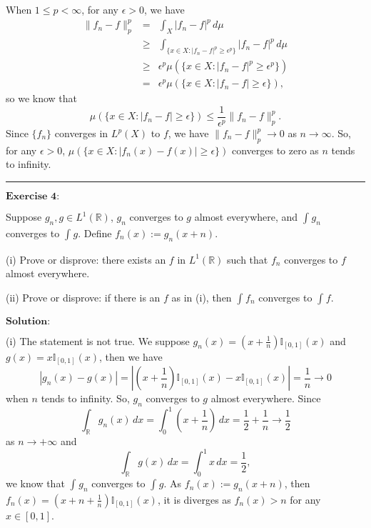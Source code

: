 \documentclass[12pt]{article}
\begin{document}
When $1 \leq p < \infty$, for any $\epsilon > 0$, we have
\begin{eqnarray*}
\|f_{n} - f\|_{p}^{p} & = & \int_{X}^{} |f_{n} - f|^{p} \, d \mu \\
& \geq & \int_{\{x \in X: |f_{n} - f|^{p} \geq \epsilon^{p}\}}^{} |f_{n} - f|^{p}  \, d \mu \\
& \geq & \epsilon^{p} \mu(\{x \in X: |f_{n} - f|^{p} \geq \epsilon^{p} \})  \\
& = & \epsilon^{p} \mu(\{x \in X: |f_{n} - f| \geq \epsilon \}),
\end{eqnarray*}
so we know that
\begin{equation*}
   \mu(\{x \in X: |f_{n} - f| \geq \epsilon \}) \leq \frac{1}{\epsilon^{p}} \| f_{n} - f \|_{p}^{p}.
\end{equation*}
Since $\{f_{n}\}$ converges in $L^{p}(X)$ to $f$, we have $\|f_{n} - f \|_{p}^{p} \to 0$ as $n \to \infty$. So, for any $\epsilon > 0$, $\mu(\{x \in X: |f_{n}(x) - f(x)| \geq \epsilon \})$ converges to zero as $n$ tends to infinity.


\vspace{8pt}

\noindent\rule[0.25\baselineskip]{\textwidth}{0.5pt}

$\textbf{Exercise 4:}$

Suppose $g_{n}, g \in L^{1}(\mathbb{R})$, $g_{n}$ converges to $g$ almost everywhere, and $\int_{}^{} g_{n} $ converges to $\int_{}^{} g$. Define $f_{n}(x) := g_{n}(x + n)$.

(i) Prove or disprove: there exists an $f$ in $L^{1}(\mathbb{R})$ such that $f_{n}$ converges to $f$ almost everywhere.

(ii) Prove or disprove: if there is an $f$ as in (i), then $\int_{}^{} f_{n}$ converges to $\int_{}^{} f$.

\vspace{8pt}
$\textbf{Solution:}$

(i) The statement is not true. We suppose $g_{n}(x) = (x + \frac{1}{n}) \mathbb{I}_{[0, 1]} (x)$ and $g(x) = x \mathbb{I}_{[0, 1]} (x)$, then we have
\begin{equation*}
   |g_{n} (x) - g(x) | = | (x + \frac{1}{n}) \mathbb{I}_{[0, 1]} (x) - x \mathbb{I}_{[0, 1]} (x) | = \frac{1}{n} \to 0
\end{equation*}
when $n$ tends to infinity. So, $g_{n}$ converges to $g$ almost everywhere. Since 
\begin{equation*}
   \int_{\mathbb{R}}^{} g_{n}(x) \, d x = \int_{0}^{1} (x + \frac{1}{n}) \, d x = \frac{1}{2} + \frac{1}{n} \to \frac{1}{2} 
\end{equation*}
as $n \to + \infty$ and
\begin{equation*}
   \int_{\mathbb{R}}^{} g (x) \, d x = \int_{0}^{1} x \, d x = \frac{1}{2},
\end{equation*}
we know that $\int_{}^{} g_{n} $ converges to $\int_{}^{} g$. As $f_{n}(x) := g_{n}(x + n)$, then $f_{n} (x) = (x + n + \frac{1}{n}) \mathbb{I}_{[0, 1]} (x)$, it is diverges as $f_{n} (x) > n$ for any $x \in [0, 1]$.
\end{document}
